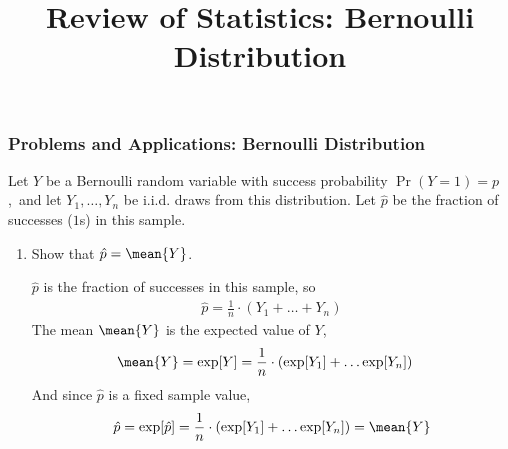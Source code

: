 \title[Probability]{Review of Statistics: Bernoulli Distribution}
\date{}







\def\ask{Let $Y$ be a Bernoulli random variable with success probability $\Pr(Y=1)=p$,\ and let $Y_1,\ldots,Y_n$ be i.i.d. draws from this distribution. Let $\hat{p}$ be the fraction of successes ($1$s) in this sample.}


\begin{frame}
\frametitle{Problems and Applications: Bernoulli Distribution}
\ask
\begin{enumerate}\setcounter{enumi}{0}

\item Show that $\hat{p} = \mean{Y}$.

\begin{answer}
$\hat{p}$ is the fraction of successes in this sample, so
\begin{align*}
\hat{p} = \frac{1}{n} \cdot (Y_1 + \ldots + Y_n)
\end{align*}
The mean $\mean{Y}$ is the expected value of $Y$,
\begin{align*}
\mean{Y} 
  = \exp[Y]
  & = \frac{1}{n} \cdot (\exp[Y_1] + \ldots \exp[Y_n])
\end{align*}
And since $\hat{p}$ is a fixed sample value,
\begin{align*}
\hat{p}
    = \exp[\hat{p}]
    = \frac{1}{n} \cdot (\exp[Y_1] + \ldots \exp[Y_n])
    = \mean{Y}
\end{align*}
\end{answer}

\end{enumerate}
\end{frame}


